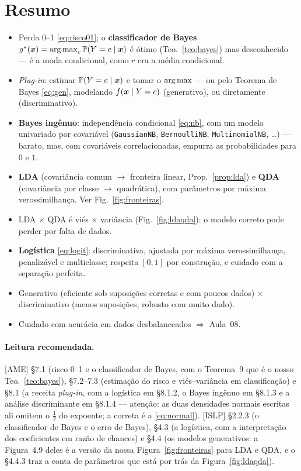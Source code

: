 \documentclass[11pt,a4paper]{article}
\begin{document}
\section*{Resumo}
\begin{itemize}[leftmargin=1.4cm]
  \item Perda 0--1 \eqref{eq:risco01}; o \textbf{classificador de Bayes}
        $g^*(\x)=\argmax_c\Prob(Y=c\mid\x)$ é ótimo (Teo.~\ref{teo:bayes}) mas
        desconhecido --- é a moda condicional, como $r$ era a média condicional.
  \item \emph{Plug-in}: estimar $\mathbb{P}(Y=c\mid\bm{x})$ e tomar o $\argmax$ --- ou pelo
        Teorema de Bayes \eqref{eq:gen}, modelando $f(\bm{x}\mid Y=c)$ (generativo), ou
        diretamente (discriminativo).
  \item \textbf{Bayes ingênuo}: independência condicional \eqref{eq:nb}, com um
        modelo univariado por covariável (\texttt{GaussianNB},
        \texttt{BernoulliNB}, \texttt{MultinomialNB}, \dots) --- barato, mas, com
        covariáveis correlacionadas, empurra as probabilidades para $0$ e $1$.
  \item \textbf{LDA} (covariância comum $\to$ fronteira linear,
        Prop.~\ref{prop:lda}) e \textbf{QDA} (covariância por classe $\to$
        quadrática), com parâmetros por máxima verossimilhança. Ver
        Fig.~\ref{fig:fronteiras}.
  \item LDA $\times$ QDA é viés $\times$ variância (Fig.~\ref{fig:ldaqda}): o
        modelo correto pode perder por falta de dados.
  \item \textbf{Logística} \eqref{eq:logit}: discriminativa, ajustada por máxima
        verossimilhança, penalizável e multiclasse; respeita $[0,1]$ por
        construção, e cuidado com a separação perfeita.
  \item Generativo (eficiente sob suposições corretas e com poucos dados) $\times$
        discriminativo (menos suposições, robusto com muito dado).
  \item Cuidado com acurácia em dados desbalanceados $\Rightarrow$ Aula~08.
\end{itemize}

\paragraph{Leitura recomendada.} [AME] §7.1 (risco 0--1 e o classificador de Bayes,
com o Teorema~9 que é o nosso Teo.~\ref{teo:bayes}), §7.2--7.3 (estimação do risco e
viés--variância em classificação) e §8.1 (a receita \emph{plug-in}, com a logística
em §8.1.2, o Bayes ingênuo em §8.1.3 e a análise discriminante em §8.1.4 ---
atenção: as duas densidades normais escritas ali omitem o $\tfrac12$ do expoente; a
correta é a \eqref{eq:normal}). [ISLP] §2.2.3 (o classificador de Bayes e o erro de
Bayes), §4.3 (a logística, com a interpretação dos coeficientes em razão de chances)
e §4.4 (os modelos generativos: a Figura~4.9 deles é a versão da nossa
Figura~\ref{fig:fronteiras} para LDA e QDA, e o §4.4.3 traz a conta de parâmetros
que está por trás da Figura~\ref{fig:ldaqda}).
\end{document}
